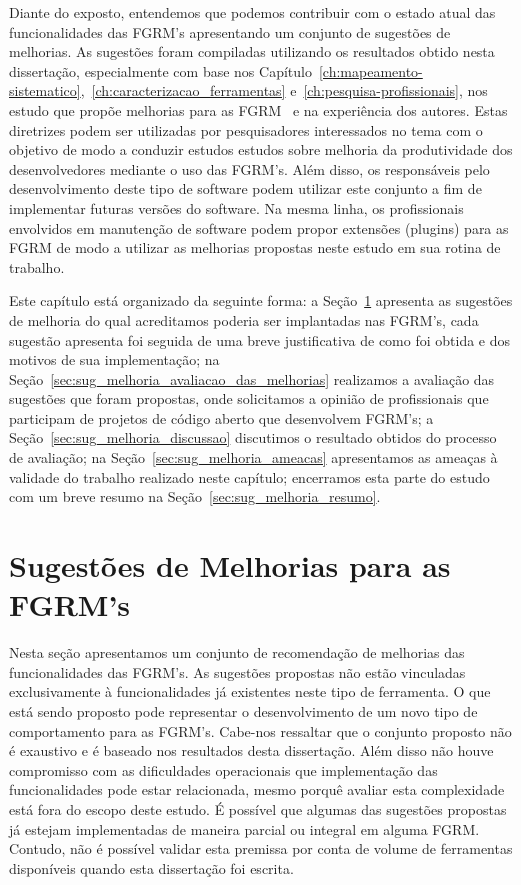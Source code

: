 Diante do exposto, entendemos que podemos contribuir com o estado atual das
funcionalidades das FGRM's apresentando um conjunto de sugestões de melhorias.
As sugestões foram compiladas utilizando os resultados obtido nesta dissertação,
especialmente com base nos
Capítulo~\ref{ch:mapeamento-sistematico},~\ref{ch:caracterizacao_ferramentas}
e~\ref{ch:pesquisa-profissionais}, nos estudo que propõe melhorias para as
FGRM~\cite{zimmermann2009improving, bettenburg2008makes, singh2011bug} e na
experiência dos autores. Estas diretrizes podem ser utilizadas por pesquisadores
interessados no tema com o objetivo de modo a conduzir estudos estudos sobre
melhoria da produtividade dos desenvolvedores mediante o uso das FGRM's. Além
disso, os responsáveis pelo desenvolvimento deste tipo de software podem
utilizar este conjunto a fim de implementar futuras versões do software. Na
mesma linha, os profissionais envolvidos em manutenção de software podem propor
extensões (plugins) para as FGRM de modo a utilizar as melhorias propostas neste
estudo em sua rotina de trabalho.

Este capítulo está organizado da seguinte forma: a
Seção~\ref{sec:sug_melhoria_melhorando_as_ferraementas} apresenta as sugestões
de melhoria do qual acreditamos poderia ser implantadas nas FGRM's, cada
sugestão apresenta foi seguida de uma breve justificativa de como foi obtida e
dos motivos de sua implementação; na
Seção~\ref{sec:sug_melhoria_avaliacao_das_melhorias} realizamos a avaliação das
sugestões que foram propostas, onde solicitamos a opinião de profissionais que
participam de projetos de código aberto que desenvolvem FGRM's; a
Seção~\ref{sec:sug_melhoria_discussao} discutimos o resultado obtidos do
processo de avaliação; na Seção~\ref{sec:sug_melhoria_ameacas} apresentamos as
ameaças à validade do trabalho realizado neste capítulo; encerramos esta parte
do estudo com um breve resumo na Seção~\ref{sec:sug_melhoria_resumo}.

\section{Sugestões de Melhorias para as FGRM's}
\label{sec:sug_melhoria_melhorando_as_ferraementas}

Nesta seção apresentamos um conjunto de recomendação de melhorias das
funcionalidades das FGRM's. As sugestões propostas não estão vinculadas
exclusivamente à funcionalidades já existentes neste tipo de ferramenta. O que
está sendo proposto pode representar o desenvolvimento de um novo tipo de
comportamento para as FGRM's. Cabe-nos ressaltar que o conjunto proposto não é
exaustivo e é baseado nos resultados desta dissertação. Além disso não houve
compromisso com as dificuldades operacionais que implementação das
funcionalidades pode estar relacionada, mesmo porquê avaliar esta complexidade
está fora do escopo deste estudo. É possível que algumas das sugestões propostas
já estejam implementadas de maneira parcial ou integral em alguma FGRM\@.
Contudo, não é possível validar esta premissa por conta de volume de ferramentas
disponíveis quando esta dissertação foi escrita.

